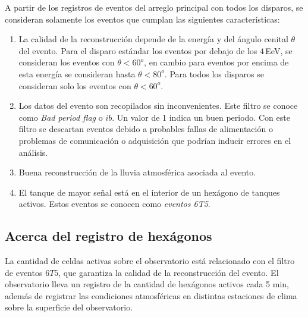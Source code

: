 A partir de los registros de eventos del arreglo principal con todos los disparos, se consideran solamente los eventos que cumplan las siguientes características:

    \begin{enumerate}
      \item La calidad de la reconstrucción depende de la energía y del ángulo cenital $\theta$ del evento.  Para el disparo estándar los eventos por debajo de los $4\,$EeV, se consideran los eventos con $\theta < 60^o$, en cambio para eventos por encima de esta energía se consideran hasta $\theta < 80^o$. Para todos los disparos se consideran solo los eventos con $\theta<60^o$.
      \item Los datos del evento son recopilados sin inconvenientes. Este filtro se conoce como \emph{Bad period flag} o $ib$. Un valor de 1 indica un buen periodo. Con este filtro se descartan eventos debido a probables fallas de alimentación o problemas de comunicación o adquisición que podrían inducir errores en el análisis.
      \item Buena reconstrucción de la lluvia atmosférica asociada al evento.
      \item El tanque de mayor señal está en el interior de un hexágono de tanques activos. Estos eventos se conocen como \textit{eventos 6T5}.
    \end{enumerate}


\subsection{Acerca del registro de hexágonos}\label{hexagonos_rate}

La cantidad de celdas  activas sobre el observatorio está relacionado con el filtro de eventos $6T5$, que garantiza la calidad de la reconstrucción del evento. El observatorio lleva un registro de la cantidad de hexágonos activos cada 5 min, además de registrar las condiciones atmosféricas en distintas estaciones de clima sobre la superficie del observatorio. 


